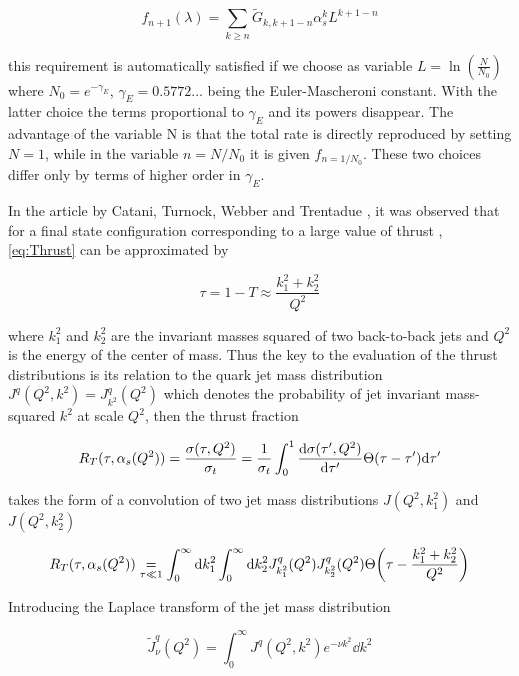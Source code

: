 \documentclass[../main.tex]{subfiles}
\begin{document}
\begin{equation}
    f_{n+1}(\lambda) = \sum_{k \ge n} \tilde{G}_{k,k+1-n} \alpha_s^k L^{k+1-n}
\end{equation}

this requirement is automatically satisfied if we choose as variable $L = \ln(\frac{N}{N_0})$ where $N_0 = e^{-\gamma_E}$, $\gamma_E = 0.5772 \dots $ being the Euler-Mascheroni constant.
With the latter choice the terms proportional to $\gamma_E$ and its powers disappear. The advantage of the variable N is that the total rate is directly reproduced by setting $N=1$, while
in the variable $n=N/N_0$ it is given $f_{n=1/N_0}$. These two choices differ only by terms of higher order in $\gamma_E$.

In the article by Catani, Turnock, Webber and Trentadue \cite{CATANI1991491}, it was observed that 
for a final state configuration corresponding to a large value of thrust , \cref{eq:Thrust} can be approximated by

\begin{equation}
    \tau = 1-T \approx \frac{k_1^2+k_2^2}{Q^2}
\end{equation}

where $k_1^2$ and $k_2^2$ are the invariant masses squared of two back-to-back jets and $Q^2$ is the energy of the center of mass.
Thus the key to the evaluation of the thrust distributions is its relation to the quark jet mass distribution $J^q(Q^2,k^2)=J^q_{k^2}(Q^2)$ which denotes
the probability of jet invariant mass-squared $k^2$ at scale $Q^2$, then the thrust fraction 

\begin{equation}
    R_T(\tau,\alpha_s(Q^2)) = \frac{\sigma(\tau,Q^2)}{\sigma_t} = \frac{1}{\sigma_t} 
    \int_0^1 \dv{\sigma(\tau',Q^2)}{\tau'} \Theta \qty(\tau - \tau') \dd \tau'
\end{equation}

takes the form of a convolution of two jet mass distributions $J(Q^2,k_1^2)$ and $J(Q^2,k_2^2)$

\begin{equation}\label{eq:Thrust fraction convolution}
    R_T(\tau,\alpha_s(Q^2)) \underset{\tau \ll 1}{=} \int_0^\infty \dd k_1^2 \int_0^\infty  \dd k_2^2 J^q_{k_1^2}(Q^2) J^q_{k_2^2}(Q^2) \Theta\qty(\tau - \frac{k_1^2+k_2^2}{Q^2}) 
\end{equation}

Introducing the Laplace transform of the jet mass distribution

\begin{equation}\label{eq:laplace_jet_mass}
    \tilde{J}^q_\nu(Q^2) = \int_0^\infty J^q(Q^2,k^2) e^{-\nu k^2} \dd k^2 
\end{equation}
\end{document}
